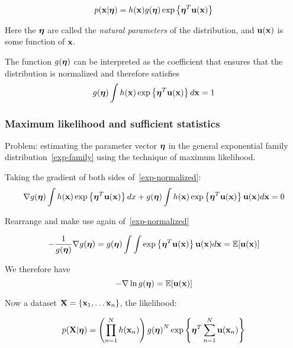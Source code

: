 \begin{equation}
    p(\mathbf{x}|\boldsymbol\eta) = h(\mathbf{x}) g(\boldsymbol\eta) \exp\left\{ \boldsymbol\eta^T \mathbf{u}(\mathbf{x})
\right\}
\label{exp-family}
\end{equation}

Here the $\boldsymbol\eta$ are called the \emph{natural parameters} of the
distribution, and $\mathbf{u}(\mathbf{x})$ is some function of $\mathbf{x}$. 

The function $g(\boldsymbol\eta)$ can be interpreted as the coefficient that
ensures that the distribution is normalized and therefore satisfies
\begin{equation} 
    g(\boldsymbol\eta) \int h(\mathbf{x}) \exp\left\{ \boldsymbol\eta^T \mathbf{u}(\mathbf{x}) \right\}d\mathbf{x}
= 1
\label{exp-normalized}
\end{equation}

\subsubsection{Maximum likelihood and sufficient statistics}
Problem: estimating the parameter vector $\boldsymbol\eta$ in the general
exponential family distribution~\ref{exp-family} using the technique of
maximum likelihood.

Taking the gradient of both sides of~\ref{exp-normalized}:
\begin{equation}
    \nabla g(\boldsymbol\eta) \int h(\mathbf{x}) \exp\left\{ \boldsymbol\eta^T \mathbf{u}(\mathbf{x}) \right\} dx
    + g(\boldsymbol\eta) \int h(\mathbf{x}) \exp\left\{ \boldsymbol\eta^T \mathbf{u}(\mathbf{x}) \right\}\mathbf{u}(\mathbf{x})
    d\mathbf{x} = 0
\end{equation}

Rearrange and make use again of~\ref{exp-normalized}

\begin{equation}
    -\frac{1}{g(\boldsymbol\eta)} \nabla g(\boldsymbol\eta) = g(\boldsymbol\eta)\int \int \exp\left\{
    \boldsymbol\eta^T \mathbf{u}(\mathbf{x}) \right\}\mathbf{u}(\mathbf{x})d\mathbf{x} = \mathbb{E}[\mathbf{u}(\mathbf{x})]
\end{equation}

We therefore have 
\begin{equation}
    -\nabla\ln{g(\boldsymbol\eta)} = \mathbb{E}[\mathbf{u}(\mathbf{x})]
\end{equation}

Now a dataset $\mathbf{X} = \{\mathbf{x}_1, \dots \mathbf{x}_n\}$, the likelihood:

\begin{equation}
    p(\mathbf{X}|\boldsymbol\eta) = \left( \prod_{n=1}^N h(\mathbf{x}_n) \right) {g(\boldsymbol\eta)}^N
    \exp\left\{ \boldsymbol\eta^T \sum_{n=1}^N \mathbf{u}(\mathbf{x}_n) \right\}
\end{equation}

